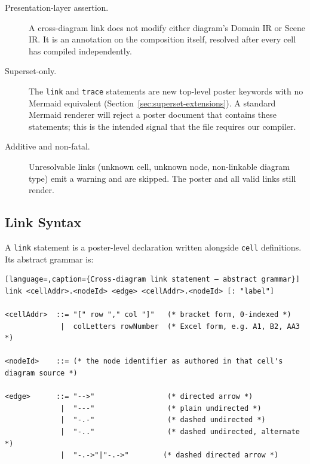 \begin{description}
  \item[Presentation-layer assertion.]
        A cross-diagram link does not modify either diagram's Domain IR or
        Scene IR.  It is an annotation on the composition itself, resolved
        after every cell has compiled independently.

  \item[Superset-only.]
        The \texttt{link} and \texttt{trace} statements are new top-level
        poster keywords with no Mermaid equivalent
        (Section~\ref{sec:superset-extensions}).  A standard Mermaid renderer
        will reject a poster document that contains these statements; this is
        the intended signal that the file requires our compiler.

  \item[Additive and non-fatal.]
        Unresolvable links (unknown cell, unknown node, non-linkable diagram
        type) emit a warning and are skipped.  The poster and all valid links
        still render.
\end{description}

\subsection{Link Syntax}
\label{sec:cdl-syntax}

A \texttt{link} statement is a poster-level declaration written alongside
\texttt{cell} definitions.  Its abstract grammar is:

\begin{lstlisting}[language=,caption={Cross-diagram link statement — abstract grammar}]
link <cellAddr>.<nodeId> <edge> <cellAddr>.<nodeId> [: "label"]

<cellAddr>  ::= "[" row "," col "]"   (* bracket form, 0-indexed *)
             |  colLetters rowNumber  (* Excel form, e.g. A1, B2, AA3 *)

<nodeId>    ::= (* the node identifier as authored in that cell's diagram source *)

<edge>      ::= "-->"                 (* directed arrow *)
             |  "---"                 (* plain undirected *)
             |  "-.-"                 (* dashed undirected *)
             |  "-.."                 (* dashed undirected, alternate *)
             |  "-.->"|"-.->"        (* dashed directed arrow *)
\end{lstlisting}

